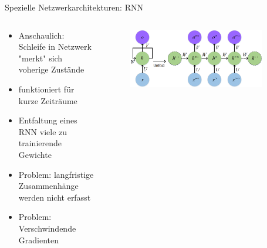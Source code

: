 \documentclass[aspectratio=1610, xcolor=dvipsnames, 9pt]{beamer}
\begin{document}
      \begin{frame}{Spezielle Netzwerkarchitekturen: RNN}
        \begin{columns}
          \begin{column}{0.6\textwidth}
            \begin{itemize}
              \item Anschaulich: Schleife in Netzwerk "merkt" sich voherige Zustände \newline 
              \item funktioniert für kurze Zeiträume \newline 
              \item Entfaltung eines RNN \rightarrow viele zu trainierende Gewichte \newline 
              \item Problem: langfristige Zusammenhänge werden nicht erfasst \newline 
              \item Problem: Verschwindende Gradienten
            \end{itemize}
          \end{column}
           \begin{column}{0.4\textwidth}
             \begin{figure}
               \centering
                           \includegraphics[width=0.9\textwidth]{images/RNN.png}
               \end{figure}

           \end{column}
        \end{columns}
      \end{frame}     
      
\end{document}

